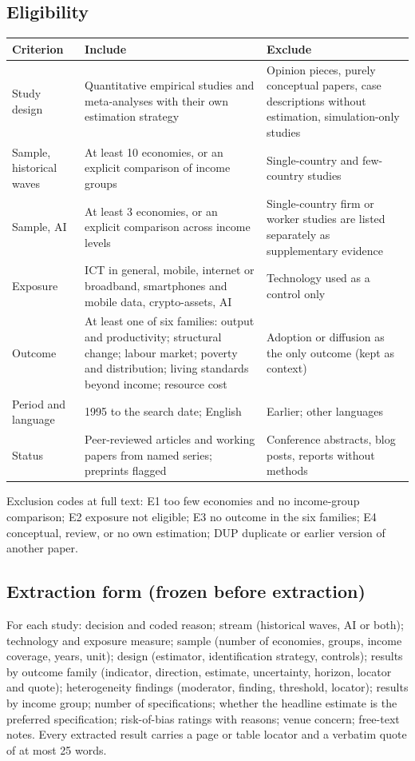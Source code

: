 \subsection*{Eligibility}
\begin{table}[H]\centering\small\begin{tabular}{@{}p{3cm}p{6cm}p{6cm}@{}}\toprule Criterion & Include & Exclude\\\midrule
Study design & Quantitative empirical studies and meta-analyses with their own estimation strategy & Opinion pieces, purely conceptual papers, case descriptions without estimation, simulation-only studies\\
Sample, historical waves & At least 10 economies, or an explicit comparison of income groups & Single-country and few-country studies\\
Sample, AI & At least 3 economies, or an explicit comparison across income levels & Single-country firm or worker studies are listed separately as supplementary evidence\\
Exposure & ICT in general, mobile, internet or broadband, smartphones and mobile data, crypto-assets, AI & Technology used as a control only\\
Outcome & At least one of six families: output and productivity; structural change; labour market; poverty and distribution; living standards beyond income; resource cost & Adoption or diffusion as the only outcome (kept as context)\\
Period and language & 1995 to the search date; English & Earlier; other languages\\
Status & Peer-reviewed articles and working papers from named series; preprints flagged & Conference abstracts, blog posts, reports without methods\\\bottomrule\end{tabular}\end{table}

Exclusion codes at full text: E1 too few economies and no income-group comparison; E2 exposure not eligible; E3 no outcome in the six families; E4 conceptual, review, or no own estimation; DUP duplicate or earlier version of another paper.

\subsection*{Extraction form (frozen before extraction)}
For each study: decision and coded reason; stream (historical waves, AI or both); technology and exposure measure; sample (number of economies, groups, income coverage, years, unit); design (estimator, identification strategy, controls); results by outcome family (indicator, direction, estimate, uncertainty, horizon, locator and quote); heterogeneity findings (moderator, finding, threshold, locator); results by income group; number of specifications; whether the headline estimate is the preferred specification; risk-of-bias ratings with reasons; venue concern; free-text notes. Every extracted result carries a page or table locator and a verbatim quote of at most 25 words.

